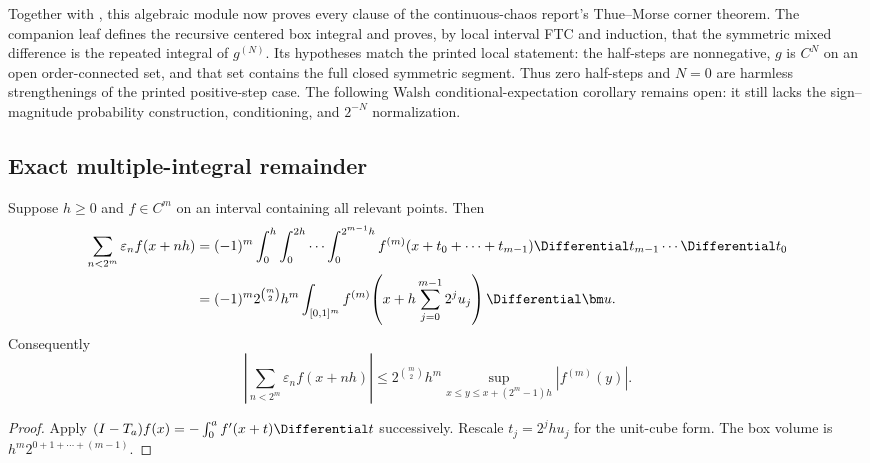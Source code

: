 \documentclass[11pt,oneside]{article}
\numberwithin{equation}{section}
\theoremstyle{definition}
\theoremstyle{remark}
\newcommand{\eps}{\varepsilon}
\begin{document}
Together with , this algebraic module now
proves every clause of the continuous-chaos report's Thue--Morse corner
theorem.  The companion leaf defines the recursive centered box integral and
proves, by local interval FTC and induction, that the symmetric mixed
difference is the repeated integral of \(g^{(N)}\).  Its hypotheses match the
printed local statement: the half-steps are nonnegative, \(g\) is
\(C^N\) on an open order-connected set, and that set contains the full closed
symmetric segment.  Thus zero half-steps and \(N=0\) are harmless
strengthenings of the printed positive-step case.  The following Walsh
conditional-expectation corollary remains open: it still lacks the
sign--magnitude probability construction, conditioning, and \(2^{-N}\)
normalization.

\subsection{Exact multiple-integral remainder}

\begin{corollary}
\label{p1:cor:integral-cubature}
Suppose \(h\ge0\) and \(f\in C^m\) on an interval containing all relevant
points.  Then
\begin{align}
 \sum_{n<2^m}\eps_nf(x+nh)
 &=(-1)^m
 \int_0^h\int_0^{2h}\cdots\int_0^{2^{m-1}h}
 f^{(m)}(x+t_0+\cdots+t_{m-1})
 \Differential t_{m-1}\cdots\Differential t_0
 \label{p1:eq:integral-cubature}\\
 &=(-1)^m2^{\binom m2}h^m
 \int_{[0,1]^m}
 f^{(m)}\!\left(x+h\sum_{j=0}^{m-1}2^ju_j\right)
 \Differential\bm u.
 \label{p1:eq:unit-cube-cubature}
\end{align}
Consequently
\begin{equation}
  \left|\sum_{n<2^m}\eps_nf(x+nh)\right|
  \le2^{\binom m2}h^m
  \sup_{x\le y\le x+(2^m-1)h}|f^{(m)}(y)|.
  \label{p1:eq:finite-difference-bound}
\end{equation}
\end{corollary}

\begin{proof}
Apply
\((I-T_a)f(x)=-\int_0^af'(x+t)\Differential t\) successively.  Rescale
\(t_j=2^jhu_j\) for the unit-cube form.  The box volume is
\(h^m2^{0+1+\cdots+(m-1)}\).
\end{proof}
\end{document}
